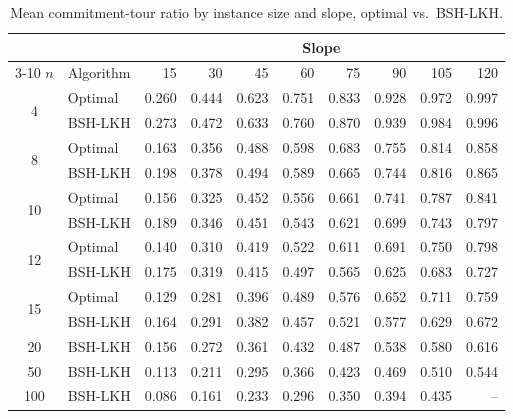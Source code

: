 \documentclass[11pt]{article}
\theoremstyle{plain}
\theoremstyle{definition}
\newcommand{\jnote}[1]{{\color{red}[{\tiny \textbf{Julian:} \bf #1}]\marginpar{\color{red}*}}}
\newcommand{\jnote}[1]{}
\begin{document}

\begin{table}[t]
\centering
\small
\begin{tabular}{c l rrrrrrrr}
	\toprule
	& & \multicolumn{8}{c}{Slope} \\
	\cmidrule(lr){3-10}
	$n$ & Algorithm & 15 & 30 & 45 & 60 & 75 & 90 & 105 & 120 \\
	\midrule
	\multirow{2}{*}{4} & Optimal & 0.260 & 0.444 & 0.623 & 0.751 & 0.833 & 0.928 & 0.972 & 0.997 \\
	& BSH-LKH & 0.273 & 0.472 & 0.633 & 0.760 & 0.870 & 0.939 & 0.984 & 0.996 \\
	\midrule
	\multirow{2}{*}{8} & Optimal & 0.163 & 0.356 & 0.488 & 0.598 & 0.683 & 0.755 & 0.814 & 0.858 \\
	& BSH-LKH & 0.198 & 0.378 & 0.494 & 0.589 & 0.665 & 0.744 & 0.816 & 0.865 \\
	\midrule
	\multirow{2}{*}{10} & Optimal & 0.156 & 0.325 & 0.452 & 0.556 & 0.661 & 0.741 & 0.787 & 0.841 \\
	& BSH-LKH & 0.189 & 0.346 & 0.451 & 0.543 & 0.621 & 0.699 & 0.743 & 0.797 \\
	\midrule
	\multirow{2}{*}{12} & Optimal & 0.140 & 0.310 & 0.419 & 0.522 & 0.611 & 0.691 & 0.750 & 0.798 \\
	& BSH-LKH & 0.175 & 0.319 & 0.415 & 0.497 & 0.565 & 0.625 & 0.683 & 0.727 \\
	\midrule
	\multirow{2}{*}{15} & Optimal & 0.129 & 0.281 & 0.396 & 0.489 & 0.576 & 0.652 & 0.711 & 0.759 \\
	& BSH-LKH & 0.164 & 0.291 & 0.382 & 0.457 & 0.521 & 0.577 & 0.629 & 0.672 \\
	\midrule
	\multirow{1}{*}{20} & BSH-LKH & 0.156 & 0.272 & 0.361 & 0.432 & 0.487 & 0.538 & 0.580 & 0.616 \\
	\midrule
	\multirow{1}{*}{50} & BSH-LKH & 0.113 & 0.211 & 0.295 & 0.366 & 0.423 & 0.469 & 0.510 & 0.544 \\
	\midrule
	\multirow{1}{*}{100} & BSH-LKH & 0.086 & 0.161 & 0.233 & 0.296 & 0.350 & 0.394 & 0.435 & -- \\
	\bottomrule
\end{tabular}
\caption{Mean commitment-tour ratio by instance size and slope, optimal vs.\ BSH-\ac{LKH}.}
\label{tab:comm_tour_slope_grid}
\end{table}
\end{document}
